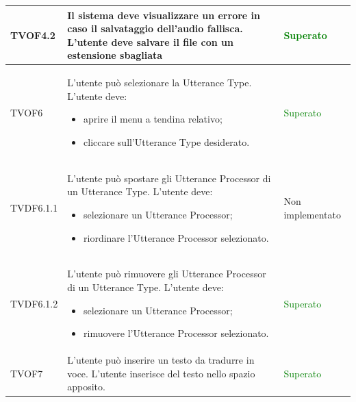 \documentclass[openany,12pt,a4paper]{report}
\begin{document}
\begin{longtable}[c]{| p{2.5cm} |p{8cm} | p{2.5cm} |}
	\hline
	\newline TVOF4.2&
	\newline Il sistema deve visualizzare un errore in caso il salvataggio dell'audio fallisca. L'utente deve salvare il file con un estensione sbagliata&
	\newline \textcolor{green}{Superato}
	\\[1em]
	
	\hline
	\newline TVOF6&
	\newline L'utente può selezionare la Utterance Type. L'utente deve:
	\begin{itemize}
		\item aprire il menu a tendina relativo;
		\item cliccare sull'Utterance Type desiderato.
	\end{itemize}&
	\newline \textcolor{green}{Superato}
	\\[1em]
	\hline
	
	\newline TVDF6.1.1&
	\newline L'utente può spostare gli Utterance Processor di un Utterance Type. L'utente deve:
	\begin{itemize}
		\item selezionare un Utterance Processor;
		\item riordinare l'Utterance Processor selezionato.
	\end{itemize}&
	\newline Non implementato
	\\[1em]
	\hline	
	
	\newline TVDF6.1.2&
	\newline L'utente può rimuovere gli Utterance Processor di un Utterance Type. L'utente deve:
	\begin{itemize}
		\item selezionare un Utterance Processor;
		\item rimuovere l'Utterance Processor selezionato.
	\end{itemize}&
	\newline \textcolor{green}{Superato}
	\\[1em]
	\hline	
	
	\newline TVOF7&
	\newline L'utente può inserire un testo da tradurre in voce. L'utente inserisce del testo nello spazio apposito.&
	\newline \textcolor{green}{Superato}
	\\[1em]
	

\end{longtable}
\end{document}
